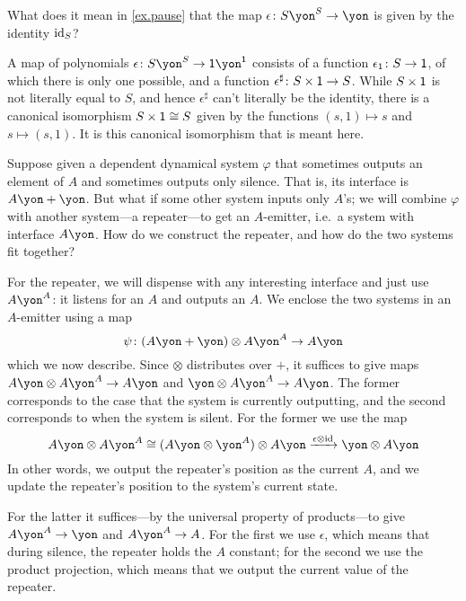 \documentclass[Book-Poly]{subfiles}
\begin{document}
\begin{exercise}\label{exc.pause}
What does it mean in \cref{ex.pause} that the map $\epsilon\colon S\yon^S\to\yon$ is given by the identity $\mathrm{id}_S$?
\begin{solution}
A map of polynomials $\epsilon\colon S\yon^S\to\1\yon^\1$ consists of a function $\epsilon_1\colon S\to\textsf{1}$, of which there is only one possible, and a function $\epsilon^\sharp\colon S\times\textsf{1}\to S$. While $S\times\textsf{1}$ is not literally equal to $S$, and hence $\epsilon^\sharp$ can't literally be the identity, there is a canonical isomorphism $S\times\textsf{1}\cong S$ given by the functions $(s,1)\mapsto s$ and $s\mapsto (s,1)$. It is this canonical isomorphism that is meant here.
\end{solution}
\end{exercise}

\begin{example}[Repeater]
Suppose given a dependent dynamical system $\varphi$ that sometimes outputs an element of $A$ and sometimes outputs only silence. That is, its interface is $A\yon+\yon$. But what if some other system inputs only $A$'s; we will combine $\varphi$ with another system---a repeater---to get an $A$-emitter, i.e.\ a system with interface $A\yon$. How do we construct the repeater, and how do the two systems fit together?

For the repeater, we will dispense with any interesting interface and just use $A\yon^A$: it listens for an $A$ and outputs an $A$. We enclose the two systems in an $A$-emitter using a map
\[\psi\colon (A\yon+\yon)\otimes A\yon^A\to A\yon\]
which we now describe. Since $\otimes$ distributes over $+$, it suffices to give maps $A\yon\otimes A\yon^A\to A\yon$ and $\yon\otimes A\yon^A\to A\yon$. The former corresponds to the case that the system is currently outputting, and the second corresponds to when the system is silent. For the former we use the map
\[
A\yon\otimes A\yon^A\cong (A\yon\otimes\yon^A)\otimes A\yon\To{\epsilon\otimes\id}\yon\otimes A\yon
\]
In other words, we output the repeater's position as the current $A$, and we update the repeater's position to the system's current state.

For the latter it suffices---by the universal property of products---to give $A\yon^A\to\yon$ and $A\yon^A\to A$. For the first we use $\epsilon$, which means that during silence, the repeater holds the $A$ constant; for the second we use the product projection, which means that we output the current value of the repeater.
\end{example}
\end{document}
